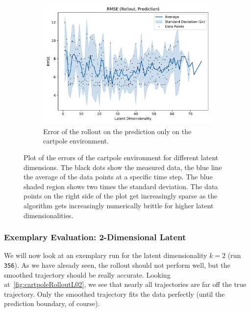 \begin{figure}
\begin{subfigure}{0.5\linewidth}
					\label{fig:cartpoleRmseTrain}
				\end{subfigure}%
				~
				\begin{subfigure}{0.5\linewidth}
					\centering
					\includegraphics[width=\linewidth]{figures/results/cartpole-gym/latent-dim/comparison-rmse-rollout-prediction-mean-vs-latent-dim.pdf}
					\caption{Error of the rollout on the prediction only on the cartpole environment.}
					\label{fig:cartpoleRmsePred}
				\end{subfigure}
				\caption{Plot of the errors of the cartpole environment for different latent dimensions. The black dots show the measured data, the blue line the average of the data points at a specific time step. The blue shaded region shows two times the standard deviation. The data points on the right side of the plot get increasingly sparse as the algorithm gets increasingly numerically brittle for higher latent dimensionalities.}
				\label{fig:cartpoleRmse}
			\end{figure}

		\subsubsection{Exemplary Evaluation: 2-Dimensional Latent}
			We will now look at an exemplary run for the latent dimensionality \( k = 2 \) (run \texttt{356}). As we have already seen, the rollout should not perform well, but the smoothed trajectory should be really accurate. Looking at~\autoref{fig:cartpoleRolloutL02}, we see that nearly all trajectories are far off the true trajectory. Only the smoothed trajectory fits the data perfectly (until the prediction boundary, of course).

